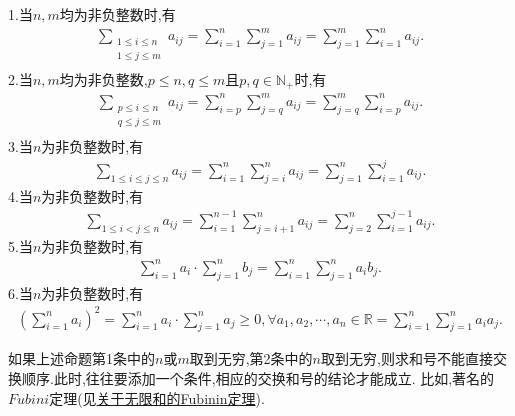 \documentclass[../../main.tex]{subfiles}%
\begin{document}
\begin{theorem}\label{theorem:求和号换序基本结论}
\hypertarget{求和号换序结论1}{1.}当$n,m$均为非负整数时,有
\begin{align*}
\sum\limits_{\substack{1\leqslant i\leqslant n\\1\leqslant j\leqslant m\\}}a_{ij}=\sum\limits_{i=1}^n{\sum\limits_{j=1}^m{a_{ij}}}=\sum\limits_{j=1}^m{\sum\limits_{i=1}^n{a_{ij}}}.
\end{align*}
2.当$n,m$均为非负整数,$p\leqslant  n,q\leqslant  m\text{且}p,q\in \mathbb{N_+}$时,有
\begin{align*}
\sum\limits_{\substack{
p\leqslant i\leqslant n\\
q\leqslant j\leqslant m\\
}}{a_{ij}}=\sum\limits_{i=p}^n{\sum\limits_{j=q}^m{a_{ij}}}=\sum\limits_{j=q}^m{\sum\limits_{i=p}^n{a_{ij}}.}
\end{align*}
\hypertarget{求和号换序结论2}{3.}当$n$为非负整数时,有
\begin{align*}
\sum\limits_{1\leqslant i\leqslant j\leqslant n}{a_{ij}}=\sum\limits_{i=1}^n{\sum\limits_{j=i}^n{a_{ij}}}=\sum\limits_{j=1}^n{\sum\limits_{i=1}^j{a_{ij}}}.
\end{align*}
4.当$n$为非负整数时,有
\begin{align*}
\sum\limits_{1\leqslant i<j\leqslant n}{a_{ij}}=\sum\limits_{i=1}^{n-1}{\sum\limits_{j=i+1}^n{a_{ij}}}=\sum\limits_{j=2}^n{\sum\limits_{i=1}^{j-1}{a_{ij}}}.
\end{align*}
5.当$n$为非负整数时,有
\begin{align*}
\sum\limits_{i=1}^n{a_i}\cdot \sum\limits_{j=1}^n{b_j}=\sum\limits_{i=1}^n{\sum\limits_{j=1}^n{a_ib_j}}.
\end{align*}
6.当$n$为非负整数时,有
\begin{align*}
\left( \sum\limits_{i=1}^n{a_i} \right) ^2=\sum\limits_{i=1}^n{a_i\cdot \sum\limits_{j=1}^n{a_j}}\geqslant 0,\forall a_1,a_2,\cdots ,a_n\in \mathbb{R}=\sum\limits_{i=1}^n{\sum\limits_{j=1}^n{a_ia_j}} .
\end{align*}
\end{theorem}
\begin{note}
如果上述命题第1条中的$n$或$m$取到无穷,第2条中的$n$取到无穷,则求和号不能直接交换顺序.此时,往往要添加一个条件,相应的交换和号的结论才能成立.
比如,著名的$Fubini$定理(见\hyperlink{关于无限和的Fubinin定理}{关于无限和的Fubinin定理}).
\end{note}
\end{document}
